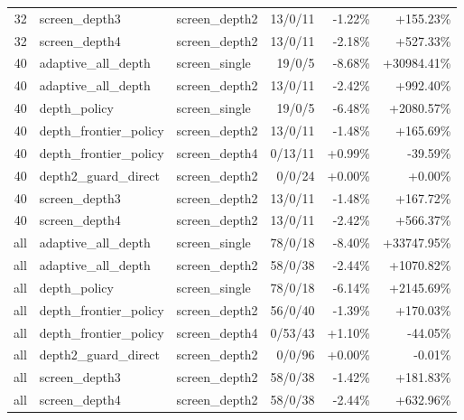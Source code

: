 \begin{tabular}{rllrrr}
32 & screen_depth3 & screen_depth2 & 13/0/11 & -1.22\% & +155.23\% \\
32 & screen_depth4 & screen_depth2 & 13/0/11 & -2.18\% & +527.33\% \\
40 & adaptive_all_depth & screen_single & 19/0/5 & -8.68\% & +30984.41\% \\
40 & adaptive_all_depth & screen_depth2 & 13/0/11 & -2.42\% & +992.40\% \\
40 & depth_policy & screen_single & 19/0/5 & -6.48\% & +2080.57\% \\
40 & depth_frontier_policy & screen_depth2 & 13/0/11 & -1.48\% & +165.69\% \\
40 & depth_frontier_policy & screen_depth4 & 0/13/11 & +0.99\% & -39.59\% \\
40 & depth2_guard_direct & screen_depth2 & 0/0/24 & +0.00\% & +0.00\% \\
40 & screen_depth3 & screen_depth2 & 13/0/11 & -1.48\% & +167.72\% \\
40 & screen_depth4 & screen_depth2 & 13/0/11 & -2.42\% & +566.37\% \\
all & adaptive_all_depth & screen_single & 78/0/18 & -8.40\% & +33747.95\% \\
all & adaptive_all_depth & screen_depth2 & 58/0/38 & -2.44\% & +1070.82\% \\
all & depth_policy & screen_single & 78/0/18 & -6.14\% & +2145.69\% \\
all & depth_frontier_policy & screen_depth2 & 56/0/40 & -1.39\% & +170.03\% \\
all & depth_frontier_policy & screen_depth4 & 0/53/43 & +1.10\% & -44.05\% \\
all & depth2_guard_direct & screen_depth2 & 0/0/96 & +0.00\% & -0.01\% \\
all & screen_depth3 & screen_depth2 & 58/0/38 & -1.42\% & +181.83\% \\
all & screen_depth4 & screen_depth2 & 58/0/38 & -2.44\% & +632.96\% \\
\bottomrule
\end{tabular}
